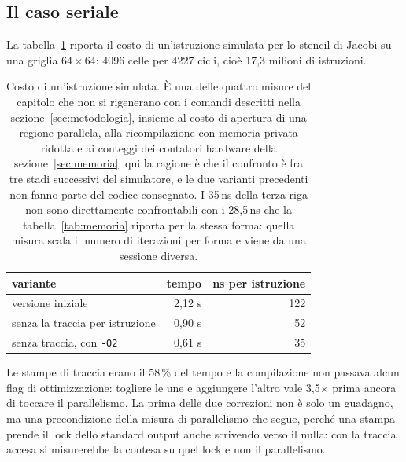 \subsection{Il caso seriale}

La tabella~\ref{tab:seriale} riporta il costo di un'istruzione simulata per
lo stencil di Jacobi su una griglia $64\times64$: 4096 celle per 4227 cicli,
cioè 17,3 milioni di istruzioni.

\begin{table}[htbp]
    \centering
    \begin{tabular}{lrr}
        \toprule
        variante & tempo & ns per istruzione \\
        \midrule
        versione iniziale & 2,12 s & 122 \\
        senza la traccia per istruzione & 0,90 s & 52 \\
        senza traccia, con \texttt{-O2} & 0,61 s & 35 \\
        \bottomrule
    \end{tabular}
    \caption[Costo di un'istruzione simulata]{Costo di un'istruzione simulata. È una delle quattro misure del
             capitolo che non si rigenerano con i comandi descritti nella
             sezione~\ref{sec:metodologia}, insieme al costo di apertura di una
             regione parallela, alla ricompilazione con memoria privata ridotta
             e ai conteggi dei contatori hardware della
             sezione~\ref{sec:memoria}: qui la ragione è
             che il confronto è fra tre stadi successivi del simulatore, e le
             due varianti precedenti non fanno parte del codice consegnato. I 35\,ns della terza riga non sono
             direttamente confrontabili con i 28,5\,ns che la
             tabella~\ref{tab:memoria} riporta per la stessa forma: quella
             misura scala il numero di iterazioni per forma e viene da una
             sessione diversa.}
    \label{tab:seriale}
\end{table}

Le stampe di traccia erano il 58\,\% del tempo e la compilazione non passava
alcun flag di ottimizzazione: togliere le une e aggiungere l'altro vale
3,5$\times$ prima ancora di toccare il parallelismo. La prima delle due
correzioni non è solo un guadagno, ma una precondizione della misura di
parallelismo che segue, perché una stampa prende il lock dello standard output
anche scrivendo verso il nulla: con la traccia accesa si misurerebbe la contesa
su quel lock e non il parallelismo.


